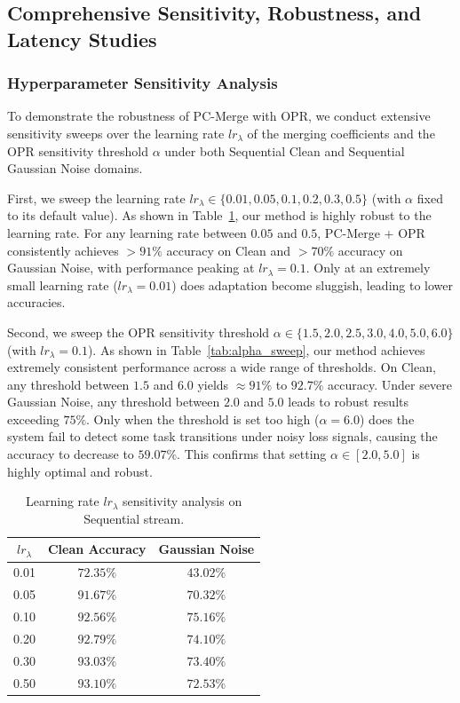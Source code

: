 \documentclass{article}
\theoremstyle{plain}
\theoremstyle{definition}
\theoremstyle{remark}
\begin{document}
\subsection{Comprehensive Sensitivity, Robustness, and Latency Studies}
\label{sec:app_sweeps}
\subsubsection{Hyperparameter Sensitivity Analysis}
To demonstrate the robustness of PC-Merge with OPR, we conduct extensive sensitivity sweeps over the learning rate $lr_\lambda$ of the merging coefficients and the OPR sensitivity threshold $\alpha$ under both Sequential Clean and Sequential Gaussian Noise domains.

First, we sweep the learning rate $lr_\lambda \in \{0.01, 0.05, 0.1, 0.2, 0.3, 0.5\}$ (with $\alpha$ fixed to its default value). As shown in Table~\ref{tab:lr_sweep}, our method is highly robust to the learning rate. For any learning rate between $0.05$ and $0.5$, PC-Merge + OPR consistently achieves $>91\%$ accuracy on Clean and $>70\%$ accuracy on Gaussian Noise, with performance peaking at $lr_\lambda = 0.1$. Only at an extremely small learning rate ($lr_\lambda = 0.01$) does adaptation become sluggish, leading to lower accuracies.

Second, we sweep the OPR sensitivity threshold $\alpha \in \{1.5, 2.0, 2.5, 3.0, 4.0, 5.0, 6.0\}$ (with $lr_\lambda = 0.1$). As shown in Table~\ref{tab:alpha_sweep}, our method achieves extremely consistent performance across a wide range of thresholds. On Clean, any threshold between $1.5$ and $6.0$ yields $\approx 91\%$ to $92.7\%$ accuracy. Under severe Gaussian Noise, any threshold between $2.0$ and $5.0$ leads to robust results exceeding $75\%$. Only when the threshold is set too high ($\alpha = 6.0$) does the system fail to detect some task transitions under noisy loss signals, causing the accuracy to decrease to $59.07\%$. This confirms that setting $\alpha \in [2.0, 5.0]$ is highly optimal and robust.

\begin{table}[h]
\caption{Learning rate $lr_\lambda$ sensitivity analysis on Sequential stream.}
\label{tab:lr_sweep}
\vskip 0.1in
\begin{center}
\begin{small}
\scshape
\begin{tabular}{ccc}
\toprule
$lr_\lambda$ & Clean Accuracy & Gaussian Noise \\
\midrule
0.01 & $72.35\%$ & $43.02\%$ \\
0.05 & $91.67\%$ & $70.32\%$ \\
0.10 & $92.56\%$ & $75.16\%$ \\
0.20 & $92.79\%$ & $74.10\%$ \\
0.30 & $93.03\%$ & $73.40\%$ \\
0.50 & $93.10\%$ & $72.53\%$ \\
\bottomrule
\end{tabular}
\end{small}
\end{center}
\vskip -0.1in
\end{table}
\end{document}
